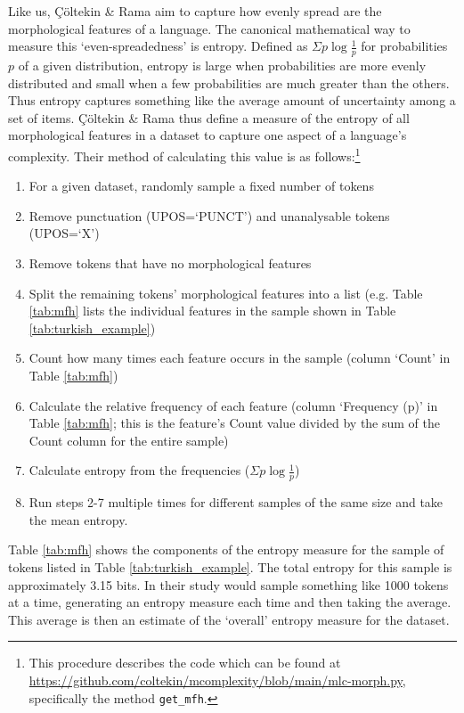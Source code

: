 \documentclass[USenglish]{article}
\begin{document}
Like us, Çöltekin \& Rama aim to capture how evenly spread are the morphological features of a language.
The canonical mathematical way to measure this `even-spreadedness' is entropy.
Defined as $\Sigma p \log{\frac{1}{p}}$ for probabilities $p$ of a given distribution, entropy is large when probabilities are more evenly distributed and small when a few probabilities are much greater than the others.
Thus entropy captures something like the average amount of uncertainty among a set of items.
Çöltekin \& Rama thus define a measure of the entropy of all morphological features in a dataset to capture one aspect of a language's complexity.
Their method of calculating this value is as follows:\footnote{This procedure describes the code which can be found at \url{https://github.com/coltekin/mcomplexity/blob/main/mlc-morph.py}, specifically the method \texttt{get\_mfh}.} %
\begin{enumerate}
\item For a given dataset, randomly sample a fixed number of tokens
\item Remove punctuation (UPOS=`PUNCT') and unanalysable tokens (UPOS=`X')
\item Remove tokens that have no morphological features
\item Split the remaining tokens' morphological features into a list (e.g. Table \ref{tab:mfh} lists the individual features in the sample shown in Table \ref{tab:turkish_example})
\item Count how many times each feature occurs in the sample (column `Count' in Table \ref{tab:mfh})
\item Calculate the relative frequency of each feature (column `Frequency (p)' in Table \ref{tab:mfh}; this is the feature's Count value divided by the sum of the Count column for the entire sample)
\item Calculate entropy from the frequencies ($\Sigma p \log{\frac{1}{p}}$)
\item Run steps 2-7 multiple times for different samples of the same size and take the mean entropy.
\end{enumerate}

\noindent Table \ref{tab:mfh} shows the components of the entropy measure for the sample of tokens listed in Table \ref{tab:turkish_example}.
The total entropy for this sample is approximately 3.15 bits.
In their study \citet{ccoltekin2023complexity} would sample something like 1000 tokens at a time, generating an entropy measure each time and then taking the average.
This average is then an estimate of the `overall' entropy measure for the dataset.
\end{document}
